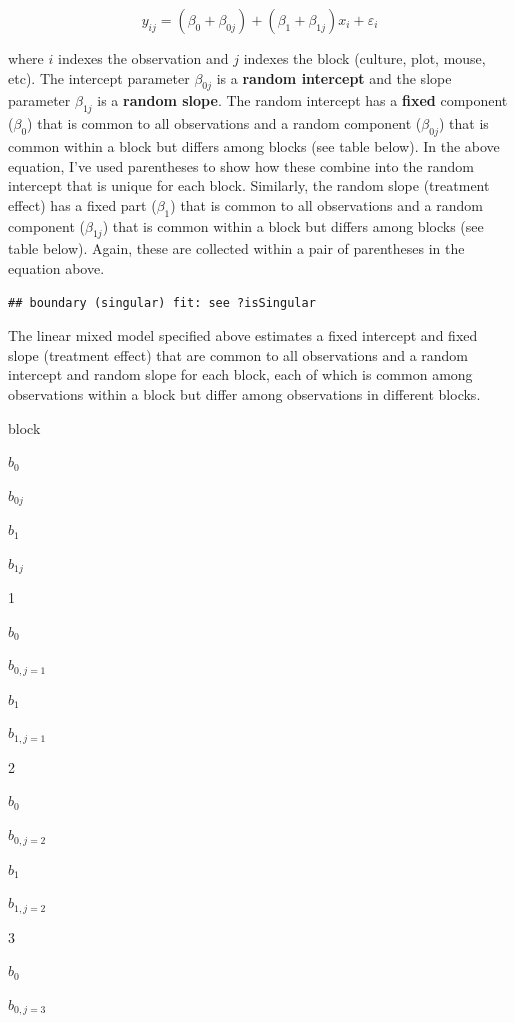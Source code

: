 \documentclass[]{book}
\begin{document}
\begin{equation}
y_{ij} = (\beta_{0} + \beta_{0j}) + (\beta_{1} + \beta_{1j}) x_i + \varepsilon_i 
\label{eq:lmm-spec1}
\end{equation}

where \(i\) indexes the observation and \(j\) indexes the block
(culture, plot, mouse, etc). The intercept parameter \(\beta_{0j}\) is a
\textbf{random intercept} and the slope parameter \(\beta_{1j}\) is a
\textbf{random slope}. The random intercept has a \textbf{fixed}
component (\(\beta_0\)) that is common to all observations and a random
component (\(\beta_{0j}\)) that is common within a block but differs
among blocks (see table below). In the above equation, I've used
parentheses to show how these combine into the random intercept that is
unique for each block. Similarly, the random slope (treatment effect)
has a fixed part (\(\beta_1\)) that is common to all observations and a
random component (\(\beta_{1j}\)) that is common within a block but
differs among blocks (see table below). Again, these are collected
within a pair of parentheses in the equation above.

\begin{verbatim}
## boundary (singular) fit: see ?isSingular
\end{verbatim}

\label{tab:lmm-table}The linear mixed model specified above estimates a
fixed intercept and fixed slope (treatment effect) that are common to
all observations and a random intercept and random slope for each block,
each of which is common among observations within a block but differ
among observations in different blocks.

block

\(b_0\)

\(b_{0j}\)

\(b_1\)

\(b_{1j}\)

1

\(b_0\)

\(b_{0,j=1}\)

\(b_1\)

\(b_{1,j=1}\)

2

\(b_0\)

\(b_{0,j=2}\)

\(b_1\)

\(b_{1,j=2}\)

3

\(b_0\)

\(b_{0,j=3}\)
\end{document}
